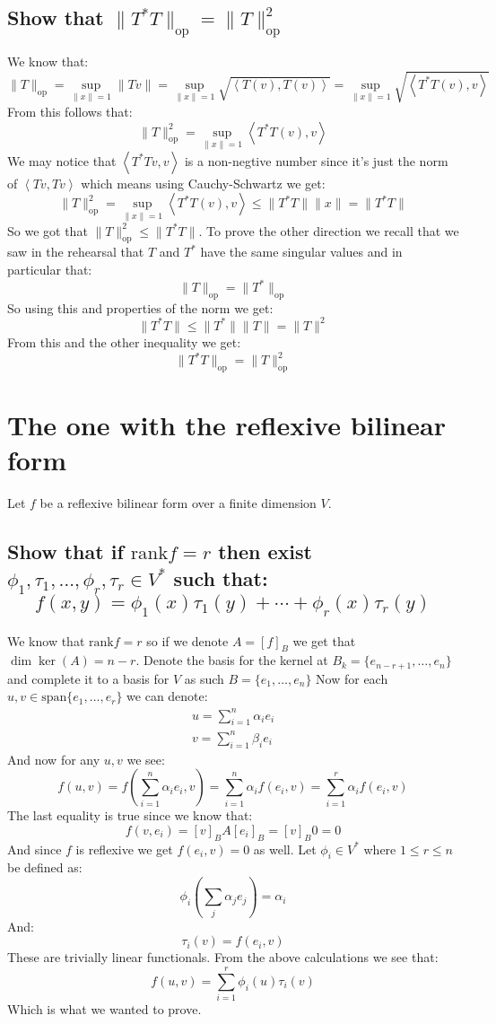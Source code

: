 \documentclass[11pt,a4paper]{article}
\theoremstyle{plain}
\newcommand{\op}{\mathrm{op}}
\newcommand{\ip}[2]{\left\langle #1, #2 \right\rangle}
\begin{document}
	\subsection{Show that $\|T^*T\|_{\text{op}} =  \|T\|_{\text{op}}^{2}$}
	We know that:
	\[
		\|T\|_{\mathrm{op}} = \sup_{\|x\|=1}{\|Tv\|} 
					= \sup_{\|x\|=1}{\sqrt{\ip{T(v)}{T(v)}}}
					= \sup_{\|x\|=1}{\sqrt{\ip{T^*T(v)}{v}}}
	\]
	From this follows that:
	\[
		\|T\|_{\op}^{2} = \sup_{\|x\|=1}{\ip{T^*T(v)}{v}}
	\]
	We may notice that $\ip{T^\ast Tv}{v}$ is a non-negtive number since it's
	just the norm of $\ip{Tv}{Tv}$ which means using Cauchy-Schwartz we get:
	\[
		\|T\|_{\op}^{2} = \sup_{\|x\|=1}{\ip{T^*T(v)}{v}} \le 
		\|T^\ast T\| \|x\| = \|T^\ast T\|
	\]
	So we got that $\|T\|_{\op}^{2} \le \|T^\ast T\|$. To prove the other
	direction we recall that we saw in the rehearsal that $T$ and $T^\ast$
	have the same singular values and in particular that:
	\[
		\|T\|_{\op} = \|T^\ast\|_{\op}
	\]
	So using this and properties of the norm we get:
	\[
		\|T^\ast T\| \le \|T^\ast\| \|T\| = \|T\|^2
	\]
	From this and the other inequality we get:
	\[
		\boxed{\|T^*T\|_{\text{op}} =  \|T\|_{\text{op}}^{2}}
	\]
	
	\newpage
	
	\section{The one with the reflexive bilinear form}
	Let $f$ be a reflexive bilinear form over a finite dimension $V$.
	\subsection{Show that if $\mathrm{rank}f=r$ then exist 
	$\phi_1,\tau_1,\dots,\phi_r,\tau_r\in V^*$ such that:
	\[
		f(x,y) = 
		\phi_{1}(x)\tau_{1}(y) + \cdots + \phi_{r}(x)\tau_{r}(y)
	\]}
 	We know that $\mathrm{rank} f = r$ so if we denote $A = [f]_B$ 
 	we get that $\dim\ker(A) = n - r$. Denote the basis for the
 	kernel at $B_k = \{e_{n-r+1}, \dots, e_n\}$ and complete it
 	to a basis for $V$ as such $B = \{e_{1}, \dots, e_n\}$ 
 	Now for each $u,v\in\mathrm{span}\{e_{1}, \dots, e_r\}$ we can 
 	denote:
	\begin{align*}
		u = \sum_{i=1}^{n}{\alpha_i e_i} \\
		v = \sum_{i=1}^{n}{\beta_i e_i}
	\end{align*}
	And now for any $u,v$ we see:
	\[
		f(u,v) = f\left(\sum_{i=1}^{n}{\alpha_i e_i}, v\right) = 
		\sum_{i=1}^{n}{\alpha_i f(e_i,v)} = 
		\sum_{i=1}^{r}{\alpha_i f(e_i,v)}
	\]
	The last equality is true since we know that:
	\[
		f(v,e_i) = [v]_B A [e_i]_B = [v]_B 0 = 0
	\]
	And since $f$ is reflexive we get $f(e_i,v) = 0$ as well.
	Let $\phi_i\in V^*$ where $1 \le r \le n$ be defined as:
	\[
		\phi_i\left(\sum_{j}{\alpha_j e_j}\right) = \alpha_i
	\]
	And:
	\[
		\tau_i(v) = f(e_i,v)
	\]
	These are trivially linear functionals. From the above calculations we see that:
	\[
		f(u,v) = \sum_{i=1}^{r}{\phi_i(u)\tau_i(v)}
	\]
	Which is what we wanted to prove.
	
\end{document}
